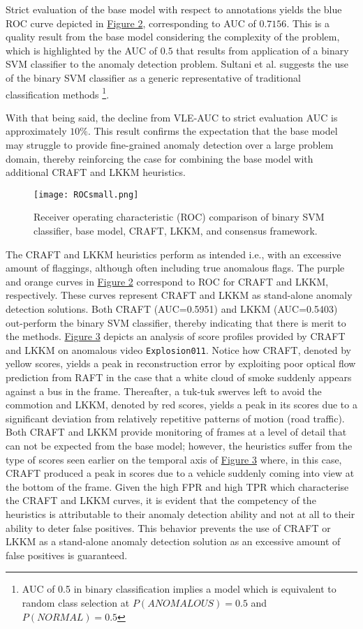 \documentclass[sigplan,authorversion,nonacm, 9pt]{acmart}
\begin{document}
\par
Strict evaluation of the base model with respect to annotations yields the blue ROC curve depicted in \hyperref[fig:ROC]{Figure 2}, corresponding to AUC of $0.7156$. This is a quality result from the base model considering the complexity of the problem, which is highlighted by the AUC of $0.5$ that results from application of a binary SVM classifier to the anomaly detection problem. Sultani et al. \cite{sultani} suggests the use of the binary SVM classifier as a generic representative of traditional classification methods \footnote{AUC of 0.5 in binary classification implies a model which is equivalent to random class selection at $P(ANOMALOUS)=0.5$ and $P(NORMAL)=0.5$}.
\par
With that being said, the decline from VLE-AUC to strict evaluation AUC is approximately $10\%$. This result confirms the expectation that the base model may struggle to provide fine-grained anomaly detection over a large problem domain, thereby reinforcing the case for combining the base model with additional CRAFT and LKKM heuristics.
\begin{figure}[h!]
    \centering
    \texttt{[image: ROCsmall.png]}
    \caption{Receiver operating characteristic (ROC) comparison of binary SVM classifier, base model, CRAFT, LKKM, and consensus framework.}
    \label{fig:ROC}
\end{figure}
The CRAFT and LKKM heuristics perform as intended i.e., with an excessive amount of flaggings, although often including true anomalous flags. The purple and orange curves in \hyperref[fig:ROC]{Figure 2} correspond to ROC for CRAFT and LKKM, respectively. These curves represent CRAFT and LKKM as stand-alone anomaly detection solutions. Both CRAFT (AUC=0.5951) and LKKM (AUC=0.5403) out-perform the binary SVM classifier, thereby indicating that there is merit to the methods. \hyperref[fig:exp011analysis]{Figure 3} depicts an analysis of score profiles provided by CRAFT and LKKM on anomalous video \texttt{Explosion011}. Notice how CRAFT, denoted by yellow scores, yields a peak in reconstruction error by exploiting poor optical flow prediction from RAFT in the case that a white cloud of smoke suddenly appears against a bus in the frame. Thereafter, a tuk-tuk swerves left to avoid the commotion and LKKM, denoted by red scores, yields a peak in its scores due to a significant deviation from relatively repetitive patterns of motion (road traffic). Both CRAFT and LKKM provide monitoring of frames at a level of detail that can not be expected from the base model; however, the heuristics suffer from the type of scores seen earlier on the temporal axis of \hyperref[fig:exp011analysis]{Figure 3} where, in this case, CRAFT produced a peak in scores due to a vehicle suddenly coming into view at the bottom of the frame. Given the high FPR and high TPR which characterise the CRAFT and LKKM curves, it is evident that the competency of the heuristics is attributable to their anomaly detection ability and not at all to their ability to deter false positives. This behavior prevents the use of CRAFT or LKKM as a stand-alone anomaly detection solution as an excessive amount of false positives is guaranteed.
\end{document}
